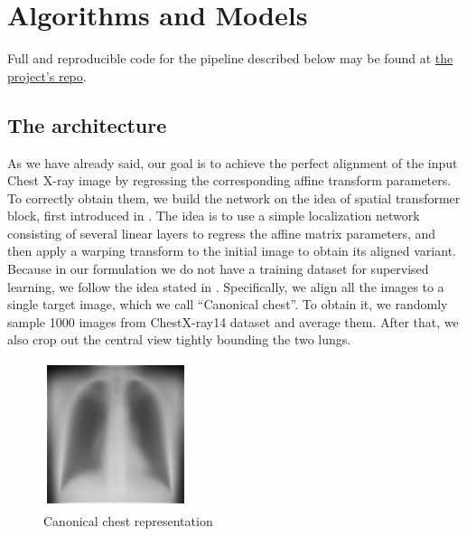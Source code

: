 \documentclass{article}
\begin{document}
\section{Algorithms and Models}\label{algorithms_and_models}
Full and reproducible code for the pipeline described below may be 
found at \href{https://github.com/bizzare-hub/Chest-Xray-alignment-using-STN.git}{the project's repo}.

\subsection{The architecture}

As we have already said, our goal is to achieve the perfect alignment of the input 
 Chest X-ray image by regressing the corresponding affine transform parameters. To 
 correctly obtain them, we build the network on the idea of spatial transformer 
 block, first introduced in \cite{SpatialTransform}. The idea is to use a simple 
 localization network consisting of several linear layers to regress the affine 
 matrix parameters, and then apply a warping transform to the initial image to 
 obtain its aligned variant.
Because in our formulation we do not have a training dataset for supervised 
 learning, we follow the idea stated in \cite{XRayDiagnosis}. Specifically, we 
 align all the images to a single target image, which we call ``Canonical chest''. 
 To obtain it, we randomly sample 1000 images from ChestX-ray14 dataset and 
 average them. After that, we also crop out the central view tightly bounding the 
 two lungs.

\begin{figure}[ht]\label{canonical_chest}
    \vskip 0.2in
    \begin{center}
    \centerline{\includegraphics[width=\columnwidth/2]{../images/canonical_chest.png}}
    \caption{Canonical chest representation}
    \end{center}
    \vskip -0.2in
\end{figure}
\end{document}

